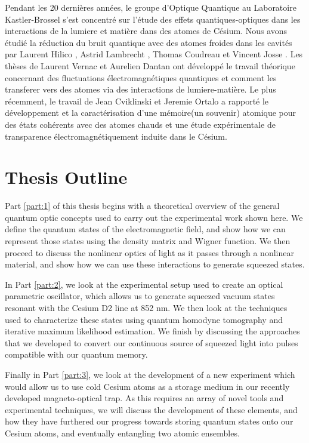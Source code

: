 Pendant les 20 dernières années, le groupe d'Optique Quantique au Laboratoire Kastler-Brossel s'est concentré sur l'étude des effets quantiques-optiques dans les interactions de la lumiere et matière dans des atomes de Césium. Nous avons étudié la réduction du bruit quantique avec des atomes froides dans les cavités par Laurent Hilico \cite {HilicoPhD}, Astrid Lambrecht \cite {LambrechtPhD}, Thomas Coudreau \cite {CoudreauPhD} et Vincent Josse \cite {JossePhD}. Les thèses de Laurent Vernac \cite {VernacPhD} et Aurelien Dantan \cite {DantanPhD} ont développé le travail théorique concernant des fluctuations électromagnétiques quantiques et comment les transferer vers des atomes via des interactions de lumiere-matière. Le plus récemment, le travail de Jean Cviklinski \cite {CviklinskiPhD} et Jeremie Ortalo \cite {ortalo} a rapporté le développement et la caractérisation d'une mémoire(un souvenir) atomique pour des états cohérents avec des atomes chauds et une étude expérimentale de transparence électromagnétiquement induite dans le Césium.

 

\newpage
\section*{Thesis Outline}

Part \ref{part:1} of this thesis begins with a theoretical overview of the general quantum optic concepts used to carry out the experimental work shown here.  We define the quantum states of the electromagnetic field, and show how we can represent those states using the density matrix and Wigner function.  We then proceed to discuss the nonlinear optics of light as it passes through a nonlinear material, and show how we can use these interactions to generate squeezed states.

In Part \ref{part:2}, we look at the experimental setup used to create an optical parametric oscillator, which allows us to generate squeezed vacuum states resonant with the Cesium D2 line at 852 nm.  We then look at the techniques used to characterize these states using quantum homodyne tomography and iterative maximum likelihood estimation.  We finish by discussing the approaches that we developed to convert our continuous source of squeezed light into pulses compatible with our quantum memory.

Finally in Part \ref{part:3}, we look at the development of a new experiment which would allow us to use cold Cesium atoms as a storage medium in our recently developed magneto-optical trap.  As this requires an array of novel tools and experimental techniques, we will discuss the development of these elements, and how they have furthered our progress towards storing quantum states onto our Cesium atoms, and eventually entangling two atomic ensembles.


